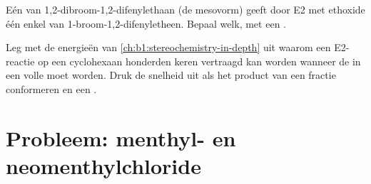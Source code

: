 \begin{exercise}[$\star\star\star$]\label{exo:b1:elimination:11}
Eén  van 1,2-dibroom-1,2-difenylethaan (de mesovorm) geeft
door E2 met ethoxide één enkel  van
1-broom-1,2-difenyletheen. Bepaal welk, met een .
\end{exercise}

\begin{exercise}[$\star\star\star$]\label{exo:b1:elimination:12}
Leg met de energieën van \cref{ch:b1:stereochemistry-in-depth} uit
waarom een E2-reactie op een cyclohexaan honderden keren vertraagd kan
worden wanneer de  in een volle   moet
worden. Druk de snelheid uit als het product van een fractie conformeren
en een .
\end{exercise}

\section{Probleem: menthyl- en neomenthylchloride}

